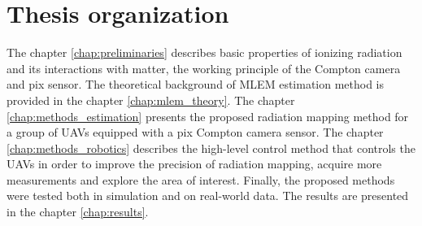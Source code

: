 \section{Thesis organization}
The chapter \ref{chap:preliminaries} describes basic properties of ionizing radiation and its interactions with matter, the working principle of the Compton camera and \ac{pix} sensor.
The theoretical background of \ac{MLEM} estimation method is provided in the chapter \ref{chap:mlem_theory}.
The chapter \ref{chap:methods_estimation} presents the proposed radiation mapping method for a group of \ac{UAV}s equipped with a \ac{pix} Compton camera sensor.
The chapter \ref{chap:methods_robotics} describes the high-level control method that controls the \ac{UAV}s in order to improve the precision of radiation mapping, acquire more measurements and explore the area of interest. 
Finally, the proposed methods were tested both in simulation and on real-world data. 
The results are presented in the chapter \ref{chap:results}.

